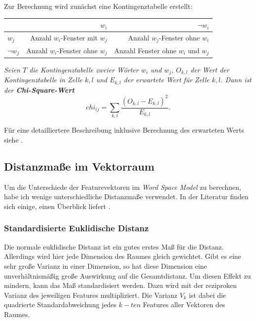 \documentclass[11pt,numbers=noenddot]{scrartcl}
\begin{document}
Zur Berechnung wird zunächst eine Kontingenztabelle erstellt:
\begin{table}[h]
    \begin{center}
        \begin{tabular}{l|r|r}
                    & $w_i$ & $\neg w_i$ \\ \hline
            $w_j$ &  Anzahl $w_i$-Fenster mit $w_j$ & Anzahl $w_j$-Fenster ohne $w_i$\\ \hline
            $\neg w_j$ &  Anzahl $w_i$-Fenster ohne $w_j$ & Anzahl Fenster ohne $w_i$ und $w_j$
        \end{tabular}
    \end{center}
\end{table}

\emph{Seien $T$ die Kontingenztabelle zweier Wörter $w_i$ und $w_j$, $O_{k,l}$ der Wert der Kontingenztabelle in Zelle $k,l$ und $E_{k,l}$ der erwartete Wert für Zelle $k,l$. Dann ist der \textbf{Chi-Square-Wert}}
\begin{equation*}
   chi_{ij} = \sum_{k,l} { \frac{ (O_{k,l} - E_{k,l})^2} {E_{k,l}}  }.
\end{equation*}

Für eine detailliertere Beschreibung inklusive Berechnung des erwarteten Werts siehe \citet[S. 169ff.]{manning1999}.

\subsection{Distanzmaße im Vektorraum}

Um die Unterschiede der Featurevektoren im \emph{Word Space Model} zu berechnen, habe ich wenige unterschiedliche Distanzmaße verwendet. In der Literatur finden sich einige, einen Überblick liefert \citet{cha2007comprehensive}.

\subsubsection{Standardisierte Euklidische Distanz} \label{eucl}

Die normale euklidische Distanz ist ein gutes erstes Maß für die Distanz. Allerdings wird hier jede Dimension des Raumes gleich gewichtet. Gibt es eine sehr große Varianz in einer Dimension, so hat diese Dimension eine unverhältnismäßig große Auswirkung auf die Gesamtdistanz. Um diesen Effekt zu mindern, kann das Maß standardisiert werden. Dazu wird mit der reziproken Varianz des jeweiligen Features multipliziert. Die Varianz $V_k$ ist dabei die quadrierte Standardabweichung jedes $k-ten$ Features aller Vektoren des Raumes.
\end{document}
